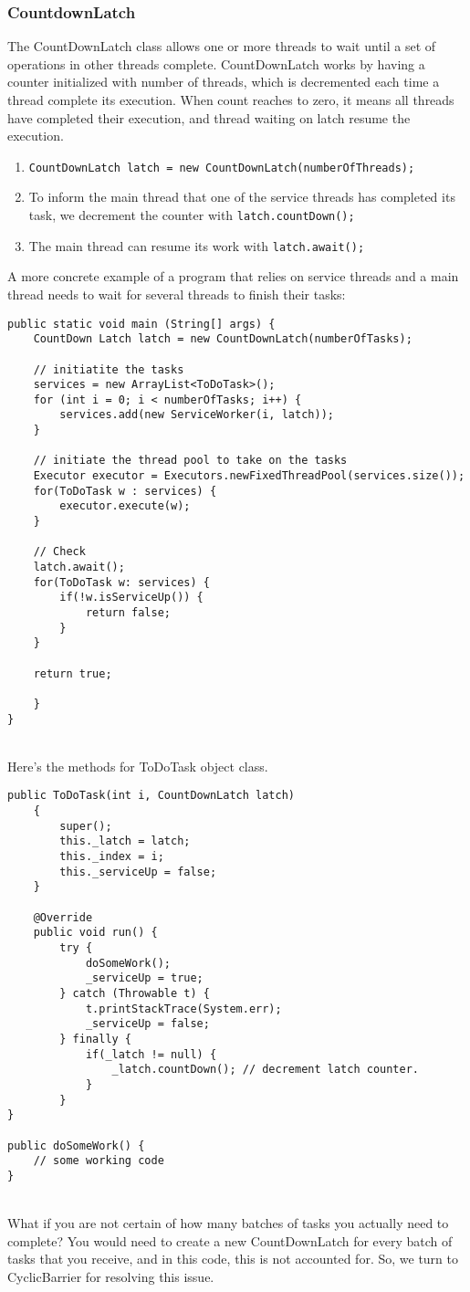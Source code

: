 \documentclass[a4paper]{article}
\begin{document}
\subsubsection{CountdownLatch}
The CountDownLatch class allows one or more threads to wait until a set of operations in other threads complete. CountDownLatch works by having a counter initialized with number of threads, which is decremented each time a thread complete its execution. When count reaches to zero, it means all threads have completed their execution, and thread waiting on latch resume the execution.
\begin{enumerate}
	\item \texttt{CountDownLatch latch = new CountDownLatch(numberOfThreads);}
	\item To inform the main thread that one of the service threads has completed its task, we decrement the counter with  \texttt{latch.countDown();}
	\item The main thread can resume its work with \texttt{latch.await();} 
\end{enumerate}
A more concrete example of a program that relies on service threads and a main thread needs to wait for several threads to finish their tasks:
\begin{verbatim}
public static void main (String[] args) {
	CountDown Latch latch = new CountDownLatch(numberOfTasks);

	// initiatite the tasks
	services = new ArrayList<ToDoTask>();
	for (int i = 0; i < numberOfTasks; i++) {
		services.add(new ServiceWorker(i, latch));
	}

	// initiate the thread pool to take on the tasks
	Executor executor = Executors.newFixedThreadPool(services.size());
	for(ToDoTask w : services) {
		executor.execute(w);
	}

	// Check
	latch.await();
	for(ToDoTask w: services) {
		if(!w.isServiceUp()) {
			return false;
		}
	}

	return true;

	}
}
\end{verbatim}
\mbox{}\\
Here's the methods for ToDoTask object class.
\\
\begin{verbatim}
public ToDoTask(int i, CountDownLatch latch)
	{
		super();
		this._latch = latch;
		this._index = i;
		this._serviceUp = false;
	}

	@Override
	public void run() {
		try {
			doSomeWork();
			_serviceUp = true;
		} catch (Throwable t) {
			t.printStackTrace(System.err);
			_serviceUp = false;
		} finally {
			if(_latch != null) {
				_latch.countDown(); // decrement latch counter.
			}
		}
}

public doSomeWork() {
	// some working code
}
\end{verbatim}
\mbox{}\\
What if you are not certain of how many batches of tasks you actually need to complete? You would need to create a new CountDownLatch for every batch of tasks that you receive, and in this code, this is not accounted for. So, we turn to CyclicBarrier for resolving this issue.
\end{document}
